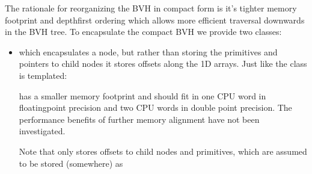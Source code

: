 \documentclass[letterpaper,10pt,english]{sphinxmanual}
\begin{document}
\sphinxAtStartPar
The rationale for reorganizing the BVH in compact form is it’s tighter memory footprint and depth\sphinxhyphen{}first ordering which allows more efficient traversal downwards in the BVH tree.
To encapsulate the compact BVH we provide two classes:
\begin{itemize}
\item {} 
\sphinxAtStartPar
{} which encapsulates a node, but rather than storing the primitives and pointers to child nodes it stores offsets along the 1D arrays.
Just like  the class is templated:

\begin{sphinxVerbatim}[commandchars=\\\{\}]
\end{sphinxVerbatim}

\sphinxAtStartPar
{} has a smaller memory footprint and should fit in one CPU word in floating\sphinxhyphen{}point precision and two CPU words in double point precision.
The performance benefits of further memory alignment have not been investigated.

\sphinxAtStartPar
Note that  only stores offsets to child nodes and primitives, which are assumed to be stored (somewhere) as

\begin{sphinxVerbatim}[commandchars=\\\{\}]
\end{sphinxVerbatim}


\end{itemize}
\end{document}
